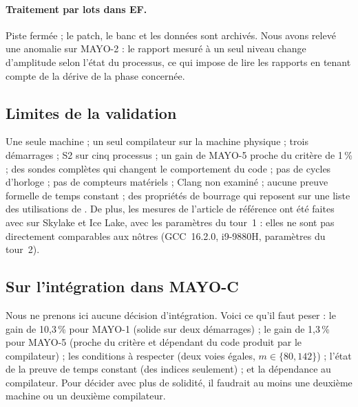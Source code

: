 \paragraph{Traitement par lots dans EF.} Piste fermée ; le patch, le banc et les données sont archivés. Nous avons relevé une anomalie sur MAYO-2 : le rapport mesuré à un seul niveau change d'amplitude selon l'état du processus, ce qui impose de lire les rapports en tenant compte de la dérive de la phase concernée.

\subsection{Limites de la validation}
Une seule machine ; un seul compilateur sur la machine physique ; trois démarrages ; S2 sur cinq processus ; un gain de MAYO-5 proche du critère de 1\,\% ; des sondes complètes qui changent le comportement du code ; pas de cycles d'horloge ; pas de compteurs matériels ; Clang non examiné ; aucune preuve formelle de temps constant ; des propriétés de bourrage qui reposent sur une liste des utilisations de . De plus, les mesures de l'article de référence ont été faites avec  sur Skylake et Ice Lake, avec les paramètres du tour~1 : elles ne sont pas directement comparables aux nôtres (GCC~16.2.0, i9-9880H, paramètres du tour~2).

\subsection{Sur l'intégration dans MAYO-C}
Nous ne prenons ici aucune décision d'intégration. Voici ce qu'il faut peser : le gain de 10,3\,\% pour MAYO-1 (solide sur deux démarrages) ; le gain de 1,3\,\% pour MAYO-5 (proche du critère et dépendant du code produit par le compilateur) ; les conditions à respecter (deux voies égales, $m\in\{80,142\}$) ; l'état de la preuve de temps constant (des indices seulement) ; et la dépendance au compilateur. Pour décider avec plus de solidité, il faudrait au moins une deuxième machine ou un deuxième compilateur.
